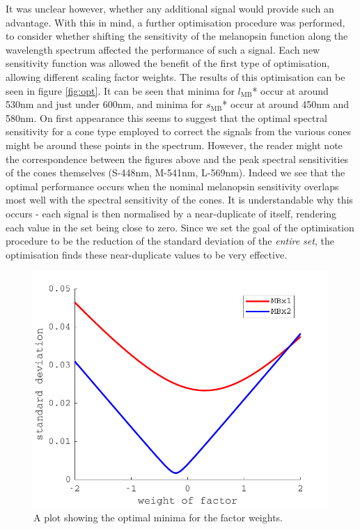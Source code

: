 It was unclear however, whether any additional signal would provide such an advantage. With this in mind, a further optimisation procedure was performed, to consider whether shifting the sensitivity of the melanopsin function along the wavelength spectrum affected the performance of such a signal. Each new sensitivity function was allowed the benefit of the first type of optimisation, allowing different scaling factor weights. The results of this optimisation can be seen in figure \ref{fig:opt}. It can be seen that minima for $l_{\text{MB}}$* occur at around 530nm and just under 600nm, and minima for $s_{\text{MB}}$* occur at around 450nm and 580nm. On first appearance this seems to suggest that the optimal spectral sensitivity for a cone type employed to correct the signals from the various cones might be around these points in the spectrum. However, the reader might note the correspondence between the figures above and the peak spectral sensitivities of the cones themselves (S-448nm, M-541nm, L-569nm). Indeed we see that the optimal performance occurs when the nominal melanopsin sensitivity overlaps most well with the spectral sensitivity of the cones. It is understandable why this occurs - each signal is then normalised by a near-duplicate of itself, rendering each value in the set being close to zero. Since we set the goal of the optimisation procedure to be the reduction of the standard deviation of the \emph{entire set}, the optimisation finds these near-duplicate values to be very effective.

\begin{figure}[htbp]
    \includegraphics[max width=\textwidth]{figs/comp/melcomp_1/minimiseSD.pdf}
    \caption{A plot showing the optimal minima for the factor weights.}
    \label{fig:minSD}
\end{figure} 

